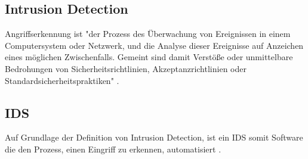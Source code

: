 \subsection{Intrusion Detection}
Angriffserkennung ist "der Prozess des Überwachung von Ereignissen in einem Computersystem oder Netzwerk, und die Analyse dieser Ereignisse auf Anzeichen eines möglichen Zwischenfalls. Gemeint sind damit Verstöße oder unmittelbare Bedrohungen von Sicherheitsrichtlinien, Akzeptanzrichtlinien oder Standardsicherheitspraktiken" \cite{scarfone2007guide}. 

\subsection{IDS}
Auf Grundlage der Definition von Intrusion Detection, ist ein IDS somit Software die den Prozess, einen Eingriff zu erkennen, automatisiert \cite{scarfone2007guide}. 





